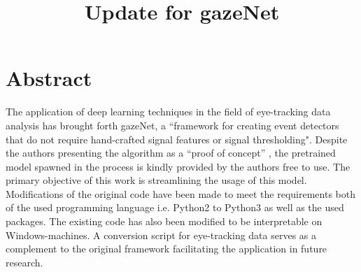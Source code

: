 \documentclass[conference]{IEEEtran}
\begin{document}
\title{Update for gazeNet\\
}

\author{
\and
{}
\and
{}
}

\maketitle
\section{Abstract}
The application of deep learning techniques in the field of eye-tracking data analysis has brought forth gazeNet, a ``framework for creating event detectors that do not require hand-crafted signal
features or signal thresholding". \citet{zemblys2018gazeNet} Despite the authors presenting the algorithm as a ``proof of concept'' \citet{zemblys2018gazeNet}, the pretrained model spawned in the process is kindly provided by the authors free to use. The primary objective of this work is streamlining the usage of this model. Modifications of the original code have been made to meet the requirements both of the used programming language i.e. Python2 to Python3 as well as the used packages. The existing code has also been modified to be interpretable on Windows-machines. A conversion script for eye-tracking data serves as a complement to the original framework facilitating the application in future research.
\end{document}

